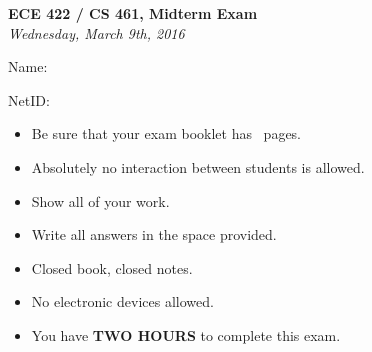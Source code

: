 \documentclass[addpoints]{exam}
\begin{document}
\begin{titlepage}
  \vspace*{\fill}
  \begin{center}
    \Large\textbf{ECE 422 / CS 461, Midterm Exam}\\
    \large\textit{Wednesday, March 9th, 2016}\\
  \end{center}
  \vspace{.5in}
  \par\large{Name:}\hrulefill\\
  \par\large{NetID:}\hrulefill\\
  \vspace{.5in}
  \begin{itemize}
  \item Be sure that your exam booklet has \numpages\ pages.
  \item Absolutely no interaction between students is allowed.
  \item Show all of your work.
  \item Write all answers in the space provided.
  \item Closed book, closed notes.
  \item No electronic devices allowed.
  \item You have \textbf{TWO HOURS} to complete this exam.
  \end{itemize}
  \vspace*{\fill}
\end{titlepage}
\newpage 

\begin{center}
  \gradetable[v][pages]
\end{center}
\newpage
\end{document}
